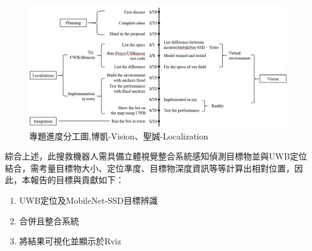 \begin{figure}[tb]
	\includegraphics[width=1.8\columnwidth]{images/sys-architecture.png}
	\centering
	\caption{專題進度分工圖,博凱-Vision、聖誠-Localization}
	\label{figure:localization_sys_architecture}
\end{figure}

綜合上述，此搜救機器人需具備立體視覺整合系統感知偵測目標物並與UWB定位結合，需考量目標物大小、定位準度、目標物深度資訊等等計算出相對位置，因此，本報告的目標與貢獻如下：

\begin{enumerate}
\item
UWB定位及MobileNet-SSD目標辨識
\item 
合併且整合系統
\item 
將結果可視化並顯示於Rviz
\end{enumerate}







